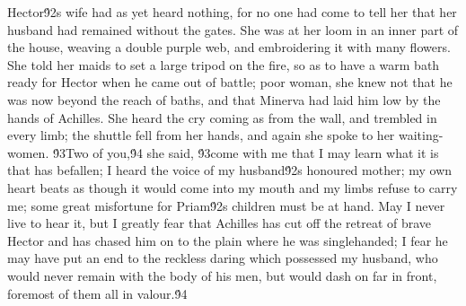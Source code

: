 {Hector\'92s wife had as yet heard nothing, for no one had come to tell her that her husband had remained without the gates. She was at her loom in an inner part of the house, weaving a double purple web, and embroidering it with many flowers. She told her maids to set a large tripod on the fire, so as to have a warm bath ready for Hector when he came out of battle; poor woman, she knew not that he was now beyond the reach of baths, and that Minerva had laid him low by the hands of Achilles. She heard the cry coming as from the wall, and trembled in every limb; the shuttle fell from her hands, and again she spoke to her waiting-women. \'93Two of you,\'94 she said, \'93come with me that I may learn what it is that has befallen; I heard the voice of my husband\'92s honoured mother; my own heart beats as though it would come into my mouth and my limbs refuse to carry me; some great misfortune for Priam\'92s children must be at hand. May I never live to hear it, but I greatly fear that Achilles has cut off the retreat of brave Hector and has chased him on to the plain where he was singlehanded; I fear he may have put an end to the reckless daring which possessed my husband, who would never remain with the body of his men, but would dash on far in front, foremost of them all in valour.\'94\
}
